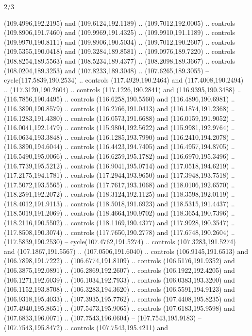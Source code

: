 \begin{flagdescription}{2/3}
\begin{scope}[shift={(0.5\flaglength,0.5)},scale=\flagwidth/320]
\begin{scope}[y=0.8pt, x=0.8pt, yscale=-1,shift={(-118.3,-146)}]
  (109.4996,192.2195) and (109.6124,192.1189) .. (109.7012,192.0005) .. controls
  (109.8906,191.7460) and (109.9969,191.4325) .. (109.9910,191.1189) .. controls
  (109.9970,190.8111) and (109.8906,190.5034) .. (109.7012,190.2607) .. controls
  (109.5355,190.0418) and (109.3284,189.8581) .. (109.0976,189.7220) .. controls
  (108.8254,189.5563) and (108.5234,189.4377) .. (108.2098,189.3667) .. controls
  (108.0204,189.3253) and (107.8233,189.3048) .. (107.6265,189.3055) --
  cycle(117.5839,190.2534) .. controls (117.4929,190.2464) and
  (117.4008,190.2494) .. (117.3120,190.2604) .. controls (117.1226,190.2841) and
  (116.9395,190.3488) .. (116.7856,190.4495) .. controls (116.6258,190.5560) and
  (116.4896,190.6981) .. (116.3890,190.8579) .. controls (116.2766,191.0413) and
  (116.1874,191.2368) .. (116.1283,191.4380) .. controls (116.0573,191.6688) and
  (116.0159,191.9052) .. (116.0041,192.1479) .. controls (115.9804,192.5622) and
  (115.9981,192.9764) .. (116.0634,193.3848) .. controls (116.1285,193.7990) and
  (116.2410,194.2078) .. (116.3890,194.6044) .. controls (116.4423,194.7405) and
  (116.4957,194.8705) .. (116.5490,195.0066) .. controls (116.6259,195.1782) and
  (116.6970,195.3496) .. (116.7739,195.5212) .. controls (116.9041,195.0714) and
  (117.0518,194.6219) .. (117.2175,194.1781) .. controls (117.2944,193.9650) and
  (117.3948,193.7518) .. (117.5072,193.5565) .. controls (117.7617,193.1068) and
  (118.0106,192.6570) .. (118.2591,192.2072) .. controls (118.3124,192.1125) and
  (118.3598,192.0119) .. (118.4012,191.9113) .. controls (118.5018,191.6923) and
  (118.5315,191.4437) .. (118.5019,191.2069) .. controls (118.4664,190.9702) and
  (118.3654,190.7396) .. (118.2116,190.5502) .. controls (118.1169,190.4377) and
  (117.9928,190.3547) .. (117.8508,190.3074) .. controls (117.7650,190.2778) and
  (117.6748,190.2604) .. (117.5839,190.2530) -- cycle(107.4762,191.5274) ..
  controls (107.3283,191.5274) and (107.1867,191.5567) .. (107.0506,191.6040) ..
  controls (106.9145,191.6513) and (106.7898,191.7222) .. (106.6774,191.8109) ..
  controls (106.5176,191.9352) and (106.3875,192.0891) .. (106.2869,192.2607) ..
  controls (106.1922,192.4205) and (106.1271,192.6039) .. (106.1034,192.7933) ..
  controls (106.0383,193.3200) and (106.1152,193.8708) .. (106.3283,194.3620) ..
  controls (106.5591,194.9123) and (106.9318,195.4033) .. (107.3935,195.7762) ..
  controls (107.4408,195.8235) and (107.4940,195.8651) .. (107.5473,195.9065) ..
  controls (107.6183,195.9598) and (107.6833,196.0071) .. (107.7543,196.0604) --
  (107.7543,195.9183) -- (107.7543,195.8472) .. controls (107.7543,195.4211) and

\end{scope}
\end{scope}
\end{flagdescription}
